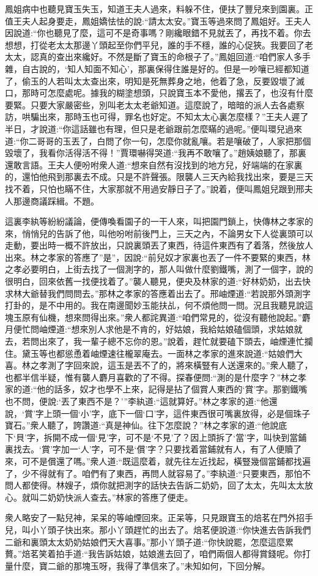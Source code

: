 \begin{parag}
    鳳姐病中也聽見寶玉失玉，知道王夫人過來，料躲不住，便扶了豐兒來到園裏。正值王夫人起身要走，鳳姐嬌怯怯的說:“請太太安。”寶玉等過來問了鳳姐好。王夫人因說道:“你也聽見了麼，這可不是奇事嗎？剛纔眼錯不見就丟了，再找不着。你去想想，打從老太太那邊丫頭起至你們平兒，誰的手不穩，誰的心促狹。我要回了老太太，認真的查出來纔好。不然是斷了寶玉的命根子了。”鳳姐回道:“咱們家人多手雜，自古說的，‘知人知面不知心’，那裏保得住誰是好的。但是一吵嚷已經都知道了，偷玉的人若叫太太查出來，明知是死無葬身之地，他着了急，反要毀壞了滅口，那時可怎麼處呢。據我的糊塗想頭，只說寶玉本不愛他，撂丟了，也沒有什麼要緊。只要大家嚴密些，別叫老太太老爺知道。這麼說了，暗暗的派人去各處察訪，哄騙出來，那時玉也可得，罪名也好定。不知太太心裏怎麼樣？”王夫人遲了半日，才說道:“你這話雖也有理，但只是老爺跟前怎麼瞞的過呢。”便叫環兒過來道:“你二哥哥的玉丟了，白問了你一句，怎麼你就亂嚷。若是嚷破了，人家把那個毀壞了，我看你活得活不得！”賈環嚇得哭道:“我再不敢嚷了。”趙姨娘聽了，那裏還敢言語。王夫人便吩咐衆人道:“想來自然有沒找到的地方兒，好端端的在家裏的，還怕他飛到那裏去不成。只是不許聲張。限襲人三天內給我找出來，要是三天找不着，只怕也瞞不住，大家那就不用過安靜日子了。”說着，便叫鳳姐兒跟到邢夫人那邊商議踩緝。不題。
\end{parag}


\begin{parag}
    這裏李紈等紛紛議論，便傳喚看園子的一干人來，叫把園門鎖上，快傳林之孝家的來，悄悄兒的告訴了他，叫他吩咐前後門上，三天之內，不論男女下人從裏頭可以走動，要出時一概不許放出，只說裏頭丟了東西，待這件東西有了着落，然後放人出來。林之孝家的答應了”是”，因說:“前兒奴才家裏也丟了一件不要緊的東西，林之孝必要明白，上街去找了一個測字的，那人叫做什麼劉鐵嘴，測了一個字，說的很明白，回來依舊一找便找着了。”襲人聽見，便央及林家的道:“好林奶奶，出去快求林大爺替我們問問去。”那林之孝家的答應着出去了。邢岫煙道:“若說那外頭測字打卦的，是不中用的。我在南邊聞妙玉能扶乩，何不煩他問一問。況且我聽見說這塊玉原有仙機，想來問得出來。”衆人都詫異道:“咱們常見的，從沒有聽他說起。”麝月便忙問岫煙道:“想來別人求他是不肯的，好姑娘，我給姑娘磕個頭，求姑娘就去，若問出來了，我一輩子總不忘你的恩。”說着，趕忙就要磕下頭去，岫煙連忙攔住。黛玉等也都慫恿着岫煙速往櫳翠庵去。一面林之孝家的進來說道:“姑娘們大喜。林之孝測了字回來說，這玉是丟不了的，將來橫豎有人送還來的。”衆人聽了，也都半信半疑，惟有襲人麝月喜歡的了不得。探春便問:“測的是什麼字？”林之孝家的道:“他的話多，奴才也學不上來，記得是拈了個賞人東西的‘賞’字。那劉鐵嘴也不問，便說:‘丟了東西不是？’”李紈道:“這就算好。”林之孝家的道:“他還說，‘賞’字上頭一個‘小’字，底下一個‘口’字，這件東西很可嘴裏放得，必是個珠子寶石。”衆人聽了，誇讚道:“真是神仙。往下怎麼說？”林之孝家的道:“他說底下‘貝’字，拆開不成一個‘見’字，可不是‘不見’了？因上頭拆了‘當’字，叫快到當鋪裏找去。‘賞’字加一‘人’字，可不是‘償’字？只要找着當鋪就有人，有了人便贖了來，可不是償還了嗎。”衆人道:“既這麼着，就先往左近找起，橫豎幾個當鋪都找遍了，少不得就有了。咱們有了東西，再問人就容易了。”李紈道:“只要東西，那怕不問人都使得。林嫂子，煩你就把測字的話快去告訴二奶奶，回了太太，先叫太太放心。就叫二奶奶快派人查去。”林家的答應了便走。
\end{parag}


\begin{parag}
    衆人略安了一點兒神，呆呆的等岫煙回來。正呆等，只見跟寶玉的焙茗在門外招手兒，叫小丫頭子快出來。那小丫頭趕忙的出去了。焙茗便說道:“你快進去告訴我們二爺和裏頭太太奶奶姑娘們天大喜事。”那小丫頭子道:“你快說罷，怎麼這麼累贅。”焙茗笑着拍手道:“我告訴姑娘，姑娘進去回了，咱們兩個人都得賞錢呢。你打量什麼，寶二爺的那塊玉呀，我得了準信來了。”未知如何，下回分解。
\end{parag}